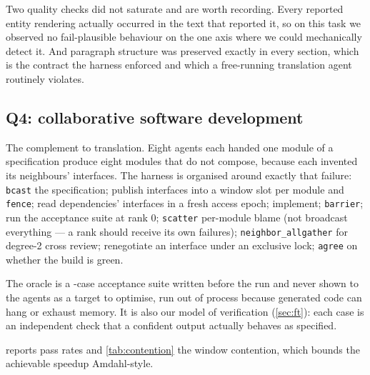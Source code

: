 \documentclass[10pt,twocolumn]{article}
\theoremstyle{definition}
\theoremstyle{plain}
\newcommand{\code}[1]{\texttt{\small #1}}
\begin{document}
Two quality checks did not saturate and are worth recording. Every reported entity
rendering actually occurred in the text that reported it, so on this task we
observed no fail-plausible behaviour on the one axis where we could
mechanically detect it. And paragraph structure was preserved exactly in every
section, which is the contract the harness enforced and which a free-running
translation agent routinely violates.

\subsection{Q4: collaborative software development}

\begin{table}[t]
\centering\scriptsize

\caption{Collaborative implementation of the \code{minidb} SQL engine against a
fixed \NAcceptanceCases-case acceptance suite written before the run. ``per round'' is the number
of cases passing after each integration round.}
\label{tab:software}
\end{table}

\begin{table}[t]
\centering\scriptsize

\caption{Contention on the shared interface window.}
\label{tab:contention}
\end{table}

The complement to translation. Eight agents each handed one module of a
specification produce eight modules that do not compose, because each invented its
neighbours' interfaces. The harness is organised around exactly that failure:
\code{bcast} the specification; publish interfaces into a window slot per module and
\code{fence}; read dependencies' interfaces in a fresh access epoch; implement;
\code{barrier}; run the acceptance suite at rank 0; \code{scatter} per-module blame
(not broadcast everything --- a rank should receive its own failures);
\code{neighbor\_allgather} for degree-2 cross review; renegotiate an interface under
an exclusive lock; \code{agree} on whether the build is green.

The oracle is a \NAcceptanceCases-case acceptance suite written before the run and never shown to
the agents as a target to optimise, run out of process because generated code can
hang or exhaust memory. It is also our model of verification (\cref{sec:ft}): each
case is an independent check that a confident output actually behaves as specified.

 reports pass rates and \cref{tab:contention} the window
contention, which bounds the achievable speedup Amdahl-style.
\end{document}
